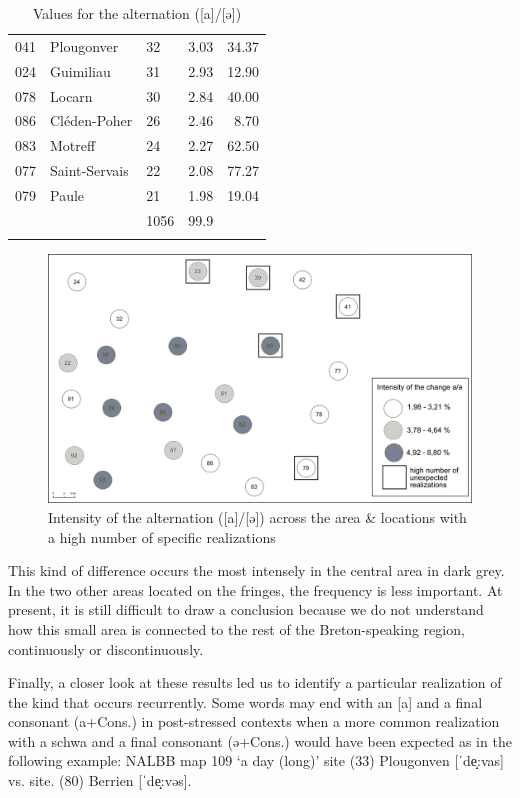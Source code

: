 \documentclass[output=paper]{LSP/langsci}
\begin{document}
\begin{table}
{\begin{tabular}{llllr}
 041 & Plougonver & 32 & 3.03 & 34.37\\
 024 & Guimiliau & 31 & 2.93 & 12.90\\
 078 & Locarn & 30 & 2.84 & 40.00\\
 086 & Cléden-Poher & 26 & 2.46 & 8.70\\
 083 & Motreff & 24 & 2.27 & 62.50\\
 077 & Saint-Servais & 22 & 2.08 & 77.27\\
 079 & Paule & 21 & 1.98 & 19.04\\
\midrule
&  & 1056 & 99.9 & \\
\lspbottomrule
\end{tabular}
}
\caption{Values for the alternation ([a]/[ə])}
\label{tab:6}
\end{table}

\begin{figure}
\includegraphics[width=\textwidth]{illustrations/brun_etal_fig6}
\caption{Intensity of the alternation ([a]/[ə]) across the area \& locations with a high number of specific realizations}
\label{fig:6}
\end{figure}

This kind of difference occurs the most intensely in the central area in dark grey. In the two other areas located on the fringes, the frequency is less important. At present, it is still difficult to draw a conclusion because we do not understand how this small area is connected to the rest of the Breton-speaking region, continuously or discontinuously.

Finally, a closer look at these results led us to identify a particular realization of the kind that occurs recurrently. Some words may end with an [a] and a final consonant (a+Cons.) in post-stressed contexts when a more common realization with a schwa and a final consonant (ə+Cons.) would have been expected as in the following example: NALBB map 109 ‘a day (long)’ site (33) Plougonven [ˈde̝:vas] vs. site. (80) Berrien [ˈde̝:vəs].
\end{document}
